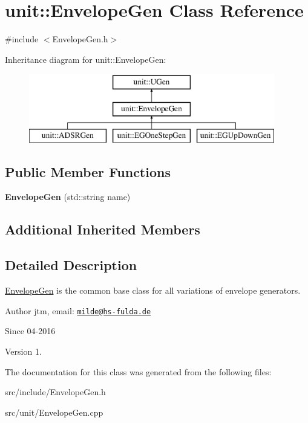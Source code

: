 \hypertarget{classunit_1_1EnvelopeGen}{\section{unit\-:\-:Envelope\-Gen Class Reference}
\label{classunit_1_1EnvelopeGen}
}


{\ttfamily \#include $<$Envelope\-Gen.\-h$>$}

Inheritance diagram for unit\-:\-:Envelope\-Gen\-:\begin{figure}[H]
\begin{center}
\leavevmode
\includegraphics[height=3.000000cm]{classunit_1_1EnvelopeGen}
\end{center}
\end{figure}
\subsection*{Public Member Functions}
\begin{DoxyCompactItemize}
\item 
\hypertarget{classunit_1_1EnvelopeGen_a2925f305c08e3316c3b1cbdabea03bde}{{\bfseries Envelope\-Gen} (std\-::string name)}\label{classunit_1_1EnvelopeGen_a2925f305c08e3316c3b1cbdabea03bde}

\end{DoxyCompactItemize}
\subsection*{Additional Inherited Members}


\subsection{Detailed Description}
\hyperlink{classunit_1_1EnvelopeGen}{Envelope\-Gen} is the common base class for all variations of envelope generators.

\begin{DoxyAuthor}{Author}
jtm, email\-:  \href{mailto:milde@hs-fulda.de}{\tt milde@hs-\/fulda.\-de} 
\end{DoxyAuthor}
\begin{DoxySince}{Since}
04-\/2016 
\end{DoxySince}
\begin{DoxyVersion}{Version}
1. 
\end{DoxyVersion}


The documentation for this class was generated from the following files\-:\begin{DoxyCompactItemize}
\item 
src/include/Envelope\-Gen.\-h\item 
src/unit/Envelope\-Gen.\-cpp\end{DoxyCompactItemize}
